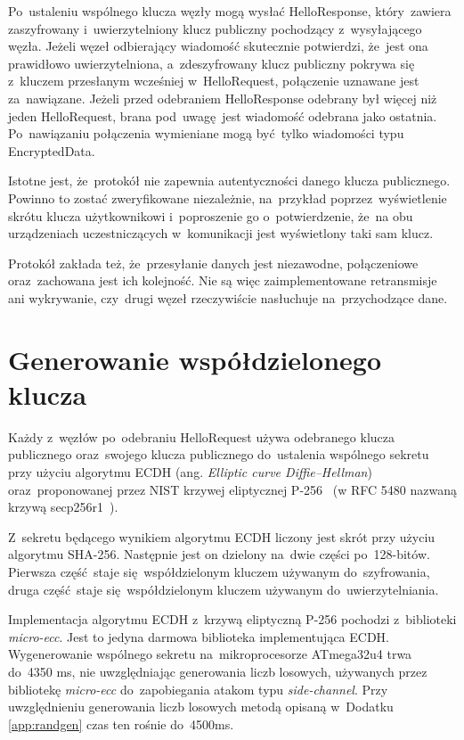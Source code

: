 Po~ustaleniu wspólnego klucza węzły mogą wysłać HelloResponse, który~zawiera zaszyfrowany i~uwierzytelniony klucz publiczny pochodzący z~wysyłającego węzła. Jeżeli węzeł odbierający wiadomość skutecznie potwierdzi, że~jest ona prawidłowo uwierzytelniona, a~zdeszyfrowany klucz publiczny pokrywa się z~kluczem przesłanym wcześniej w~HelloRequest, połączenie uznawane jest za~nawiązane. Jeżeli przed odebraniem HelloResponse odebrany był więcej niż jeden HelloRequest, brana pod~uwagę jest wiadomość odebrana jako ostatnia. Po~nawiązaniu połączenia wymieniane mogą być tylko wiadomości typu EncryptedData.

Istotne jest, że~protokół nie zapewnia autentyczności danego klucza publicznego. Powinno to zostać zweryfikowane niezależnie, na~przykład poprzez~wyświetlenie skrótu klucza użytkownikowi i~poproszenie go o~potwierdzenie, że~na obu urządzeniach uczestniczących w~komunikacji jest wyświetlony taki sam klucz.

Protokół zakłada też, że~przesyłanie danych jest niezawodne, połączeniowe oraz~zachowana jest ich kolejność. Nie są więc zaimplementowane retransmisje ani wykrywanie, czy~drugi węzeł rzeczywiście nasłuchuje na~przychodzące dane.

\section{Generowanie współdzielonego klucza}
\label{sec:sharedkey}

Każdy z~węzłów po~odebraniu HelloRequest używa odebranego klucza publicznego oraz~swojego klucza publicznego do~ustalenia wspólnego sekretu przy użyciu algorytmu ECDH (ang. \emph{Elliptic curve Diffie--Hellman}) oraz~proponowanej przez NIST krzywej eliptycznej P-256~\cite{kerry2013digital} (w RFC 5480 nazwaną krzywą secp256r1~\cite{turner2009elliptic}).

Z~sekretu będącego wynikiem algorytmu ECDH liczony jest skrót przy użyciu algorytmu SHA-256. Następnie jest on dzielony na~dwie części po~128-bitów. Pierwsza część staje się współdzielonym kluczem używanym do~szyfrowania, druga część staje się współdzielonym kluczem używanym do~uwierzytelniania.

Implementacja algorytmu ECDH z~krzywą eliptyczną P-256 pochodzi z~biblioteki \emph{micro-ecc}. Jest to jedyna darmowa biblioteka implementująca ECDH. Wygenerowanie wspólnego sekretu na~mikroprocesorze ATmega32u4 trwa do~4350 ms, nie uwzględniając generowania liczb losowych, używanych przez bibliotekę \emph{micro-ecc} do~zapobiegania atakom typu \emph{side-channel}. Przy uwzględnieniu generowania liczb losowych metodą opisaną w~Dodatku \ref{app:randgen} czas ten rośnie do~4500ms.

